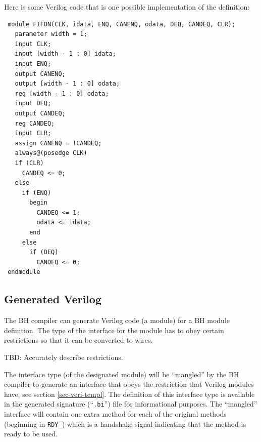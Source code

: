 \documentclass[twoside,letterpaper]{article}
\newcommand{\BH}{BH}
\newcommand{\veri}{Verilog}
\newcommand{\te}[1]{\texttt{#1}}
\newcommand{\tbd}[1]{{\sf TBD: #1}}
\newcommand{\qbs}[1]{``\mbox{\te{#1}}''}
\begin{document}
{Here is some {\veri} code that is one possible implementation of the definition:
\begin{verbatim}
 module FIFON(CLK, idata, ENQ, CANENQ, odata, DEQ, CANDEQ, CLR);
   parameter width = 1;
   input CLK;
   input [width - 1 : 0] idata;
   input ENQ;
   output CANENQ;
   output [width - 1 : 0] odata;
   reg [width - 1 : 0] odata;
   input DEQ;
   output CANDEQ;
   reg CANDEQ;
   input CLR;
   assign CANENQ = !CANDEQ;
   always@(posedge CLK)
   if (CLR)
     CANDEQ <= 0;
   else
     if (ENQ)
       begin
         CANDEQ <= 1;
         odata <= idata;
       end
     else
       if (DEQ)
         CANDEQ <= 0;
 endmodule
\end{verbatim}
}


\subsection{Generated {\veri}}

The {\BH} compiler can generate {\veri} code (a module) for a
{\BH} module definition.  The type of the interface for the module
has to obey certain restrictions so that it can be converted to wires.

\tbd{Accurately describe restrictions.}

The interface type (of the designated module) will be ``mangled'' by
the {\BH} compiler to generate an interface that obeys the
restriction that {\veri} modules have, see section
{\ref{sec-veri-templ}}.  The definition of this interface type is
available in the generated signature (\qbs{.bi}) file for
informational purposes.  The ``mangled'' interface will contain one
extra method for each of the original methods (beginning in \te{RDY\_})
which is a handshake signal indicating that the method is ready to be
used.

\end{document}
